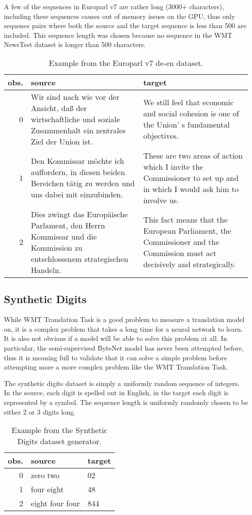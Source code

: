 A few of the sequences in Europarl v7 are rather long (3000+ characters), including these sequences causes out of memory issues on the GPU, thus only sequence pairs where both the source and the target sequence is less than 500 are included. This sequence length was chosen because no sequence in the WMT NewsTest dataset is longer than 500 characters.

\begin{table}[H]
\centering
\begin{tabular}{r|p{5cm} p{5cm}}
	obs. & source & target\\ \hline
        0 & Wir sind nach wie vor der Ansicht, daß der wirtschaftliche und soziale Zusammenhalt ein zentrales Ziel der Union ist. & We still feel that economic and social cohesion is one of the Union' s fundamental objectives. \\
        1 & Den Kommissar möchte ich auffordern, in diesen beiden Bereichen tätig zu werden und uns dabei mit einzubinden. & These are two areas of action which I invite the Commissioner to set up and in which I would ask him to involve us. \\
        2  & Dies zwingt das Europäische Parlament, den Herrn Kommissar und die Kommission zu entschlossenem strategischen Handeln. & This fact means that the European Parliament, the Commissioner and the Commission must act decisively and strategically.
\end{tabular}
\caption{Example from the Europarl v7 de-en dataset.}
\end{table}

\subsection{Synthetic Digits}

While WMT Translation Task is a good problem to measure a translation model on, it is a complex problem that takes a long time for a neural network to learn. It is also not obvious if a model will be able to solve this problem at all. In particular, the semi-supervised ByteNet model has never been attempted before, thus it is meaning full to validate that it can solve a simple problem before attempting more a more complex problem like the WMT Translation Task.

The synthetic digits dataset is simply a uniformly random sequence of integers. In the source, each digit is spelled out in English, in the target each digit is represented by a symbol. The sequence length is uniformly randomly chosen to be either 2 or 3 digits long.
\begin{table}[H]
\centering
\begin{tabular}{r|p{5cm} p{5cm}}
	obs. & source & target\\ \hline
	0 & zero two & 02 \\
    1 & four eight & 48 \\
    2 & eight four four & 844
\end{tabular}
\caption{Example from the Synthetic Digits dataset generator.}
\end{table}
